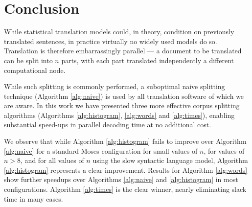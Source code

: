 \documentclass{pbml}
\begin{document}
\section{Conclusion}
%
While statistical translation models could, in theory, condition on previously translated sentences, in practice virtually no widely used models do so.
%
Translation is therefore embarrassingly parallel ---
%
a document to be translated can be split into $n$ parts, with each part translated independently a different computational node.

While such splitting is commonly performed, a suboptimal naive splitting technique (Algorithm \ref{alg:naive}) is used by all translation software of which we are aware. 
%
In this work we have presented three more effective corpus splitting algorithms (Algorithms \ref{alg:histogram}, \ref{alg:words} and \ref{alg:times}), 
% 
enabling substantial speed-ups in parallel decoding time at no additional cost.

We observe that while Algorithm \ref{alg:histogram} fails to improve over Algorithm \ref{alg:naive} for a standard Moses configuration for small values of $n$, for values of $n>8$, and for all values of $n$ using the slow syntactic language model, Algorithm \ref{alg:histogram} represents a clear improvement. Results for Algorithm \ref{alg:words} show further speedups over Algorithms \ref{alg:naive} and \ref{alg:histogram} in most configurations. Algorithm \ref{alg:times} is the clear winner, nearly eliminating slack time in many cases.

%
%
%
\end{document}
